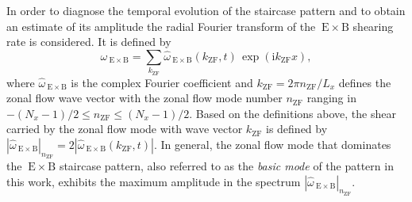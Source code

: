 \documentclass[aip, amsmath, amssymb, reprint, twocolumn, floatfix]{revtex4-1}
\newcommand{\wexb}{\omega_{\mathrm{\:E \times B}}}
\newcommand{\hatwexb}{\widehat{\omega}_{\mathrm{\:E \times B}}}
\newcommand{\exb}{\mathrm{\:E}\times\mathrm{B}}
\newcommand{\hatwexbamp}{|\hatwexb|_{\nzf}}
\newcommand{\nzf}{n_\mathrm{ZF}}
\newcommand{\kzf}{k_\mathrm{ZF}}
\newcommand{\xcoord}{x}
\begin{document}
\newpage
In order to diagnose the temporal evolution of the staircase pattern and to obtain an estimate of its amplitude the radial Fourier transform of the $\exb$ shearing rate is considered. 
It is defined by
\begin{equation}
	\wexb = \sum_{\kzf} \hatwexb(\kzf,t) \, \exp(\mathrm{i} \kzf \xcoord),
	\label{eq:shearingrate_fourier}
\end{equation}
where $\hatwexb$ is the complex Fourier coefficient and \linebreak $\kzf = 2\pi \nzf/L_\xcoord$
defines the zonal flow wave vector with the zonal flow mode number $\nzf$ ranging in $-(N_\xcoord -1)/2 \leq \nzf \leq (N_\xcoord -1)/2 $.
Based on the definitions above, the shear carried by the zonal flow mode with wave vector $\kzf$ is defined by $\hatwexbamp = 2 |\hatwexb(\kzf,t)|$. 
In general, the zonal flow mode that dominates the $\exb$ staircase pattern, also referred to as the \textit{basic mode} of the pattern in this work, exhibits the maximum amplitude in the spectrum $\hatwexbamp$.\\



\end{document}
